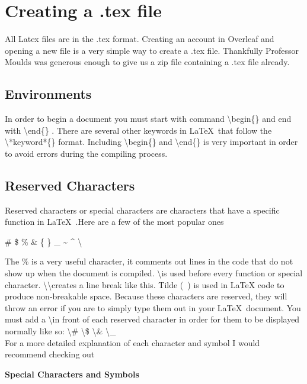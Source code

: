 \documentclass[12pt,journal,compsoc]{IEEEtran}
\begin{document}



\section{Creating a .tex file}
All Latex files are in the .tex format. Creating an account in Overleaf and opening a new file is a very simple way to create a .tex file. Thankfully Professor Moulds was generous enough to give us a zip file containing a .tex file already.

\subsection{Environments}
In order to begin a document you must start with command \textbackslash{begin\{\}} and end with \textbackslash{end\{\}} . There are several other keywords in \LaTeX\ that follow the \textbackslash{*keyword*\{\}} format. Including \textbackslash{begin\{\}} and \textbackslash{end\{\}} is very important in order to avoid errors during the compiling process.

\subsection{Reserved Characters}
Reserved characters or special characters are characters that have a specific function in \LaTeX\  .Here are a few of the most popular ones \begin{center}
  \# \$ \% \& \{ \} \_ \~{} \^{} \textbackslash \\
\end{center}
The \% is a very useful character, it comments out lines in the code that do not show up when the document is compiled. \textbackslash is used before every function or special character. \textbackslash \textbackslash  creates  a line  break like this. Tilde (~) is used in LaTeX code to produce non-breakable space. Because these characters are reserved, they will throw an error if you are to simply type them out in your \LaTeX\ document. You must add a \textbackslash in front of each reserved character in order for them to be displayed normally like so: \textbackslash \#  \textbackslash \$ \textbackslash \& \textbackslash \_ \\  For a more detailed explanation of each character and symbol I would recommend checking out
\begin{center}


\textbf{Special Characters and Symbols}
\end{center}
\end{document}
